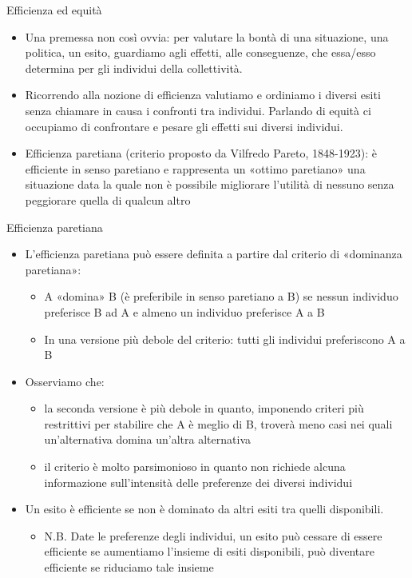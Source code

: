 \documentclass[aspectratio=149,11pt]{beamer}
\begin{document}
\begin{frame}{Efficienza ed equità}
\begin{itemize}
\item Una premessa non così ovvia: per valutare la bontà di una situazione, una politica, un esito, guardiamo agli \alert{effetti}, alle \alert{conseguenze}, che essa/esso determina per gli individui della collettività.
\item Ricorrendo alla nozione di \alert{efficienza} valutiamo e ordiniamo i diversi esiti senza chiamare in causa i confronti tra individui. Parlando di \alert{equità} ci occupiamo di confrontare e pesare gli effetti sui diversi individui.
\item \alert{Efficienza paretiana} (criterio proposto da Vilfredo Pareto, 1848-1923): è efficiente in senso paretiano e rappresenta un «ottimo paretiano» una situazione data la quale non è possibile migliorare l’utilità di nessuno senza peggiorare quella di qualcun altro
\end{itemize}
\end{frame}

\begin{frame}{Efficienza paretiana}
\begin{itemize}
\item L’efficienza paretiana può essere definita a partire dal criterio di «dominanza paretiana»:
\begin{itemize}
\item A «domina» B (è preferibile in senso paretiano a B) se nessun individuo preferisce B ad A e almeno un individuo preferisce A a B
\item In una versione più debole del criterio: tutti gli individui preferiscono A a B
\end{itemize}
\item Osserviamo che:
\begin{itemize}
\item la seconda versione è più debole in quanto, imponendo criteri più restrittivi per stabilire che A è meglio di B, troverà meno casi nei quali un’alternativa domina un’altra alternativa
\item il criterio è molto parsimonioso in quanto non richiede alcuna informazione sull’intensità delle preferenze dei diversi individui
\end{itemize}
\item Un esito è efficiente se non è dominato da altri esiti tra quelli disponibili.
\begin{itemize}
\item N.B. Date le preferenze degli individui, un esito può cessare di essere efficiente se aumentiamo l’insieme di esiti disponibili, può diventare efficiente se riduciamo tale insieme
\end{itemize}
\end{itemize}
\end{frame}
\end{document}
